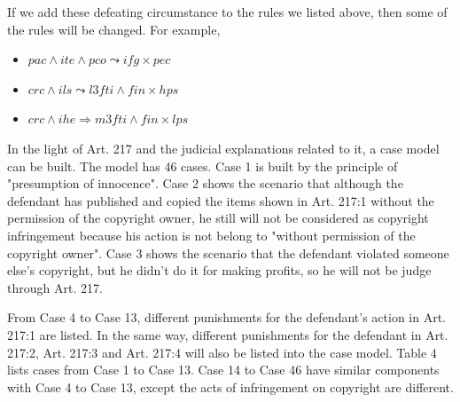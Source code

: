 \documentclass{IOS-Book-Article}
\begin{document}
If we add these defeating circumstance to the rules we listed above, then some of the rules will be changed. For example,
\begin{itemize}
\item $pac \wedge ite \wedge pco \leadsto ifg \times pec$
\item $crc \wedge ils \leadsto l3fti \wedge fin \times hps$
\item $crc \wedge ihe \Rightarrow m3fti \wedge fin \times lps$
\end{itemize}

In the light of Art. 217 and the judicial explanations related to it, a case model can be built. The model has 46 cases. Case 1 is built by the principle of "presumption of innocence". Case 2 shows the scenario that although the defendant has published and copied the items shown in Art. 217:1 without the permission of the copyright owner, he still will not be considered as copyright infringement because his action is not belong to "without permission of the copyright owner". Case 3 shows the scenario that the defendant violated someone else's copyright, but he didn't do it for making profits, so he will not be judge through Art. 217.

From Case 4 to Case 13, different punishments for the defendant's action in Art. 217:1 are listed. In the same way, different punishments for the defendant in Art. 217:2, Art. 217:3 and Art. 217:4 will also be listed into the case model. Table 4 lists cases from Case 1 to Case 13. Case 14 to Case 46 have similar components with Case 4 to Case 13, except the acts of infringement on copyright are different.
\end{document}
